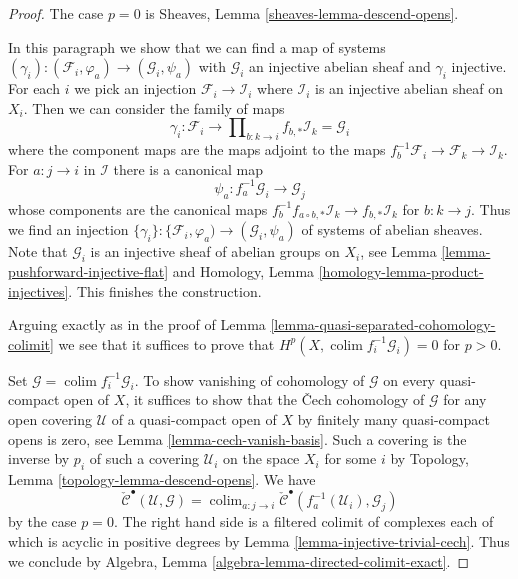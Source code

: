 \documentclass[10pt,a4paper]{amsart}
\theoremstyle{plain}
\theoremstyle{definition}
\theoremstyle{remark}
\numberwithin{equation}{subsection}
\def\colim{\mathop{\mathrm{colim}}\nolimits}
\begin{document}
\begin{proof}
The case $p = 0$ is Sheaves, Lemma \ref{sheaves-lemma-descend-opens}.

\medskip\noindent
In this paragraph we show that we can find a map of systems
$(\gamma_i) : (\mathcal{F}_i, \varphi_a) \to (\mathcal{G}_i, \psi_a)$
with $\mathcal{G}_i$ an injective abelian sheaf and $\gamma_i$ injective.
For each $i$ we pick an injection $\mathcal{F}_i \to \mathcal{I}_i$
where $\mathcal{I}_i$ is an injective abelian sheaf on $X_i$.
Then we can consider the family of maps
$$
\gamma_i :
\mathcal{F}_i
\longrightarrow
\prod\nolimits_{b : k \to i} f_{b, *}\mathcal{I}_k = \mathcal{G}_i
$$
where the component maps are the maps adjoint to the maps
$f_b^{-1}\mathcal{F}_i \to \mathcal{F}_k \to \mathcal{I}_k$.
For $a : j \to i$ in $\mathcal{I}$ there is a canonical map
$$
\psi_a : f_a^{-1}\mathcal{G}_i \to \mathcal{G}_j
$$
whose components are the canonical maps
$f_b^{-1}f_{a \circ b, *}\mathcal{I}_k \to f_{b, *}\mathcal{I}_k$
for $b : k \to j$. Thus we find an injection
$\{\gamma_i\} : \{\mathcal{F}_i, \varphi_a) \to (\mathcal{G}_i, \psi_a)$
of systems of abelian sheaves. Note that $\mathcal{G}_i$ is an injective
sheaf of abelian groups on $X_i$, see
Lemma \ref{lemma-pushforward-injective-flat} and
Homology, Lemma \ref{homology-lemma-product-injectives}.
This finishes the construction.

\medskip\noindent
Arguing exactly as in the proof of
Lemma \ref{lemma-quasi-separated-cohomology-colimit}
we see that it suffices to prove that
$H^p(X, \colim f_i^{-1}\mathcal{G}_i) = 0$ for $p > 0$.

\medskip\noindent
Set $\mathcal{G} = \colim f_i^{-1}\mathcal{G}_i$.
To show vanishing of cohomology of $\mathcal{G}$ on every quasi-compact
open of $X$, it suffices to show that the {\v C}ech cohomology of
$\mathcal{G}$ for any open covering $\mathcal{U}$ of a quasi-compact open of
$X$ by finitely many quasi-compact opens is zero, see
Lemma \ref{lemma-cech-vanish-basis}.
Such a covering is the inverse by $p_i$ of such a covering $\mathcal{U}_i$
on the space $X_i$ for some $i$ by
Topology, Lemma \ref{topology-lemma-descend-opens}. We have
$$
\check{\mathcal{C}}^\bullet(\mathcal{U}, \mathcal{G}) =
\colim_{a : j \to i}
\check{\mathcal{C}}^\bullet(f_a^{-1}(\mathcal{U}_i), \mathcal{G}_j)
$$
by the case $p = 0$. The right hand side is a filtered colimit of
complexes each of which is acyclic in positive degrees by
Lemma \ref{lemma-injective-trivial-cech}. Thus we conclude by
Algebra, Lemma \ref{algebra-lemma-directed-colimit-exact}.
\end{proof}
\end{document}
